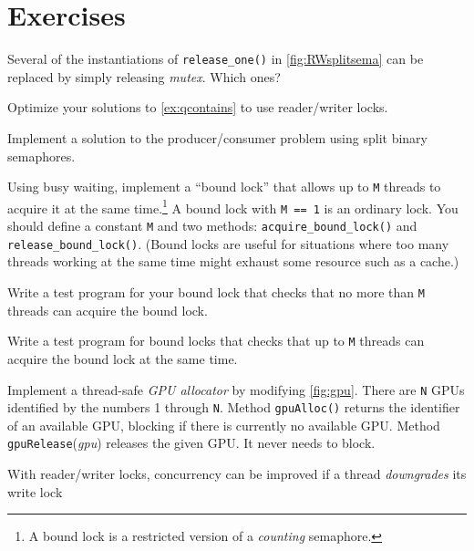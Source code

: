\documentclass{report}
\begin{document}
\section*{Exercises}
\begin{problems}
\item Several of the instantiations of \texttt{release\_one()} in
\autoref{fig:RWsplitsema} can be replaced by simply releasing \textit{mutex}.
Which ones?
\item Optimize your solutions to \autoref{ex:qcontains} to use reader/writer locks.
\item \label{ex:bbsbs} Implement a solution to the producer/consumer problem
using split binary semaphores.
\item \label{ex:boundlock} Using busy waiting, implement a ``bound lock'' that allows
up to \texttt{M} threads to acquire it at the same time.\footnote{A bound lock is a restricted version of a \emph{counting} semaphore.}
A bound lock
with \texttt{M == 1} is an ordinary lock.
You should define a constant \texttt{M} and two methods:
\texttt{acquire\_bound\_lock()}
and \texttt{release\_bound\_lock()}.
(Bound locks are useful for situations where too many threads working
at the same time might exhaust some resource such as a cache.)
\item Write a test program for your bound lock
that checks that no more than \texttt{M} threads can acquire the
bound lock.
\item Write a test program for bound locks
that checks that up to \texttt{M} threads
can acquire the bound lock at the same time.
\item \label{ex:gpu} Implement a thread-safe \emph{GPU allocator} by modifying
\autoref{fig:gpu}.
There are \texttt{N} GPUs identified by the numbers
1 through \texttt{N}.  Method \texttt{gpuAlloc()} returns the identifier
of an available GPU, blocking if there is currently no available GPU.
Method \texttt{gpuRelease}(\textit{gpu}) releases the given GPU.  It never needs
to block.
\item With reader/writer locks,
concurrency can be improved if a thread \emph{downgrades} its write lock

\end{problems}
\end{document}
